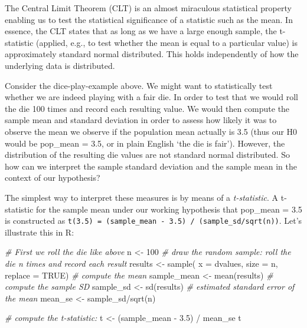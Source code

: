 \documentclass[
  12pt,
]{style/krantz}
\newenvironment{Shaded}{\begin{snugshade}}{\end{snugshade}}
\newcommand{\AttributeTok}[1]{\textcolor[rgb]{0.77,0.63,0.00}{#1}}
\newcommand{\CommentTok}[1]{\textcolor[rgb]{0.56,0.35,0.01}{\textit{#1}}}
\newcommand{\ConstantTok}[1]{\textcolor[rgb]{0.00,0.00,0.00}{#1}}
\newcommand{\DecValTok}[1]{\textcolor[rgb]{0.00,0.00,0.81}{#1}}
\newcommand{\FloatTok}[1]{\textcolor[rgb]{0.00,0.00,0.81}{#1}}
\newcommand{\FunctionTok}[1]{\textcolor[rgb]{0.00,0.00,0.00}{#1}}
\newcommand{\NormalTok}[1]{#1}
\newcommand{\OtherTok}[1]{\textcolor[rgb]{0.56,0.35,0.01}{#1}}
\newcommand{\SpecialCharTok}[1]{\textcolor[rgb]{0.00,0.00,0.00}{#1}}
\begin{document}
The Central Limit Theorem (CLT) is an almost miraculous statistical property enabling us to test the statistical significance of a statistic such as the mean. In essence, the CLT states that as long as we have a large enough sample, the t-statistic (applied, e.g., to test whether the mean is equal to a particular value) is approximately standard normal distributed. This holds independently of how the underlying data is distributed.

Consider the dice-play-example above. We might want to statistically test whether we are indeed playing with a fair die. In order to test that we would roll the die 100 times and record each resulting value. We would then compute the sample mean and standard deviation in order to assess how likely it was to observe the mean we observe if the population mean actually is 3.5 (thus our H0 would be pop\_mean = 3.5, or in plain English `the die is fair'). However, the distribution of the resulting die values are not standard normal distributed. So how can we interpret the sample standard deviation and the sample mean in the context of our hypothesis?

The simplest way to interpret these measures is by means of a \emph{t-statistic}. A t-statistic for the sample mean under our working hypothesis that pop\_mean = 3.5 is constructed as \texttt{t(3.5)\ =\ (sample\_mean\ -\ 3.5)\ /\ (sample\_sd/sqrt(n))}. Let's illustrate this in R:

\begin{Shaded}
\begin{Highlighting}[]
\CommentTok{\# First we roll the die like above}
\NormalTok{n }\OtherTok{\textless{}{-}} \DecValTok{100}
\CommentTok{\# draw the random sample: \textquotesingle{}roll the die n times and record each result\textquotesingle{}}
\NormalTok{results }\OtherTok{\textless{}{-}} \FunctionTok{sample}\NormalTok{( }\AttributeTok{x =}\NormalTok{ dvalues, }\AttributeTok{size =}\NormalTok{ n, }\AttributeTok{replace =} \ConstantTok{TRUE}\NormalTok{)}
\CommentTok{\# compute the mean}
\NormalTok{sample\_mean }\OtherTok{\textless{}{-}} \FunctionTok{mean}\NormalTok{(results)}
\CommentTok{\# compute the sample SD}
\NormalTok{sample\_sd }\OtherTok{\textless{}{-}} \FunctionTok{sd}\NormalTok{(results)}
\CommentTok{\# estimated standard error of the mean}
\NormalTok{mean\_se }\OtherTok{\textless{}{-}}\NormalTok{ sample\_sd}\SpecialCharTok{/}\FunctionTok{sqrt}\NormalTok{(n)}

\CommentTok{\# compute the t{-}statistic:}
\NormalTok{t }\OtherTok{\textless{}{-}}\NormalTok{ (sample\_mean }\SpecialCharTok{{-}} \FloatTok{3.5}\NormalTok{) }\SpecialCharTok{/}\NormalTok{ mean\_se}
\NormalTok{t}
\end{Highlighting}
\end{Shaded}
\end{document}
